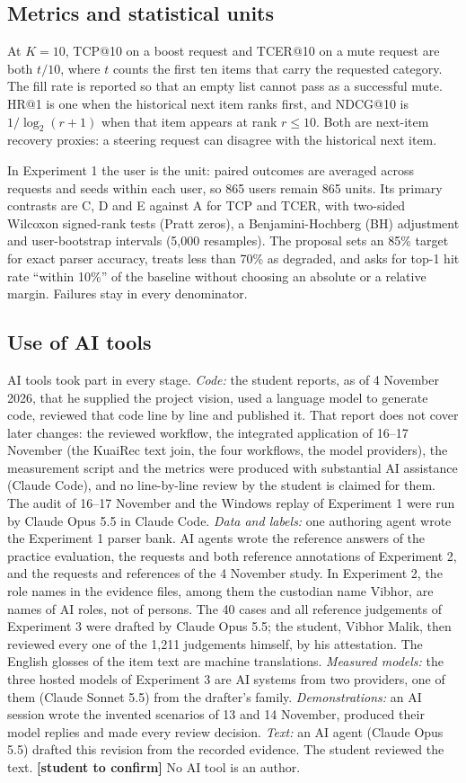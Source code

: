 \documentclass[conference]{IEEEtran}
\newcommand{\StudentConfirm}[1]{#1 \textbf{[student to confirm]}}
\begin{document}
\subsection{Metrics and statistical units}
At $K=10$, TCP@10 on a boost request and TCER@10 on a mute request are both $t/10$, where $t$ counts the first ten items that carry the requested category. The fill rate is reported so that an empty list cannot pass as a successful mute. HR@1 is one when the historical next item ranks first, and NDCG@10 is $1/\log_2(r+1)$ when that item appears at rank $r\leq10$. Both are next-item recovery proxies: a steering request can disagree with the historical next item.

In Experiment 1 the user is the unit: paired outcomes are averaged across requests and seeds within each user, so 865 users remain 865 units. Its primary contrasts are C, D and E against A for TCP and TCER, with two-sided Wilcoxon signed-rank tests (Pratt zeros), a Benjamini-Hochberg (BH) adjustment and user-bootstrap intervals (5,000 resamples). The proposal sets an 85\% target for exact parser accuracy, treats less than 70\% as degraded, and asks for top-1 hit rate ``within 10\%'' of the baseline without choosing an absolute or a relative margin. Failures stay in every denominator.

\subsection{Use of AI tools}\label{sec:ai}
AI tools took part in every stage. \emph{Code:} the student reports, as of 4 November 2026, that he supplied the project vision, used a language model to generate code, reviewed that code line by line and published it. That report does not cover later changes: the reviewed workflow, the integrated application of 16--17 November (the KuaiRec text join, the four workflows, the model providers), the measurement script and the metrics were produced with substantial AI assistance (Claude Code), and no line-by-line review by the student is claimed for them. The audit of 16--17 November and the Windows replay of Experiment 1 were run by Claude Opus 5.5 in Claude Code. \emph{Data and labels:} one authoring agent wrote the Experiment 1 parser bank. AI agents wrote the reference answers of the practice evaluation, the requests and both reference annotations of Experiment 2, and the requests and references of the 4 November study. In Experiment 2, the role names in the evidence files, among them the custodian name Vibhor, are names of AI roles, not of persons. The 40 cases and all reference judgements of Experiment 3 were drafted by Claude Opus 5.5; the student, Vibhor Malik, then reviewed every one of the 1,211 judgements himself, by his attestation. The English glosses of the item text are machine translations. \emph{Measured models:} the three hosted models of Experiment 3 are AI systems from two providers, one of them (Claude Sonnet 5.5) from the drafter's family. \emph{Demonstrations:} an AI session wrote the invented scenarios of 13 and 14 November, produced their model replies and made every review decision. \emph{Text:} an AI agent (Claude Opus 5.5) drafted this revision from the recorded evidence. \StudentConfirm{The student reviewed the text.} No AI tool is an author.
\end{document}
